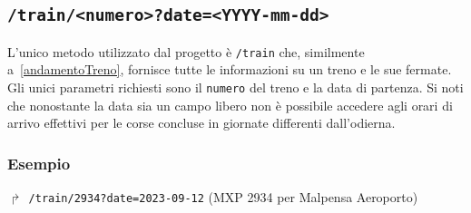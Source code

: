 \documentclass[12pt,a4paper,italian]{report}
\begin{document}
\subsection{\texttt{/train/<numero>?date=<YYYY-mm-dd>}}

L'unico metodo utilizzato dal progetto è \texttt{/train} che,
similmente a~\ref{andamentoTreno}, fornisce tutte le informazioni su
un treno e le sue fermate.  Gli unici parametri richiesti sono il
\texttt{numero} del treno e la data di partenza.  Si noti che
nonostante la data sia un campo libero non è possibile accedere agli
orari di arrivo effettivi per le corse concluse in giornate differenti
dall'odierna.

\subsubsection{Esempio}
$\Rsh$ \texttt{/train/2934?date=2023-09-12} \hfill (MXP 2934 per
Malpensa Aeroporto)
\end{document}
